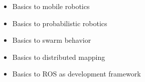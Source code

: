 \begin{itemize}
	\item{Basics to mobile robotics}
	\item{Basics to probabilistic robotics}
	\item{Basics to swarm behavior}
	\item{Basics to distributed mapping}
	\item{Basics to ROS as development framework}
\end{itemize}

